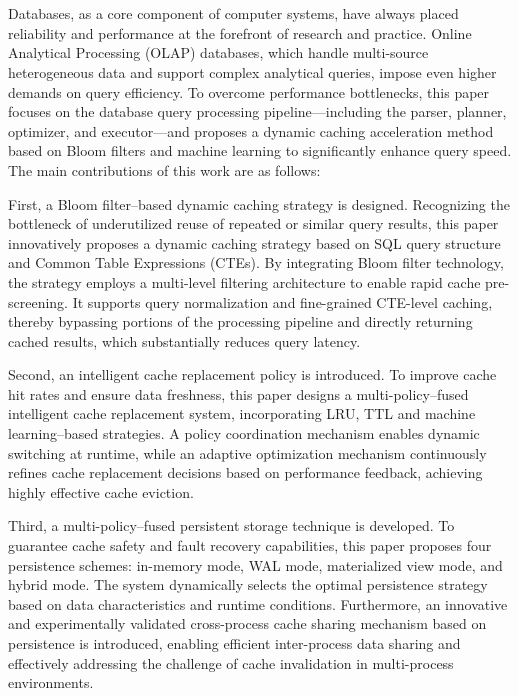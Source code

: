 \newpage
\vspace{-1cm}
\chapter*{}
\vspace{-0.5cm}

Databases, as a core component of computer systems, have always placed reliability and performance at the forefront of research and practice. Online Analytical Processing (OLAP) databases, which handle multi-source heterogeneous data and support complex analytical queries, impose even higher demands on query efficiency. To overcome performance bottlenecks, this paper focuses on the database query processing pipeline—including the parser, planner, optimizer, and executor—and proposes a dynamic caching acceleration method based on Bloom filters and machine learning to significantly enhance query speed. The main contributions of this work are as follows:

First, a Bloom filter–based dynamic caching strategy is designed. Recognizing the bottleneck of underutilized reuse of repeated or similar query results, this paper innovatively proposes a dynamic caching strategy based on SQL query structure and Common Table Expressions (CTEs). By integrating Bloom filter technology, the strategy employs a multi-level filtering architecture to enable rapid cache pre-screening. It supports query normalization and fine-grained CTE-level caching, thereby bypassing portions of the processing pipeline and directly returning cached results, which substantially reduces query latency.

Second, an intelligent cache replacement policy is introduced. To improve cache hit rates and ensure data freshness, this paper designs a multi-policy–fused intelligent cache replacement system, incorporating LRU, TTL and machine learning–based strategies. A policy coordination mechanism enables dynamic switching at runtime, while an adaptive optimization mechanism continuously refines cache replacement decisions based on performance feedback, achieving highly effective cache eviction.

Third, a multi-policy–fused persistent storage technique is developed. To guarantee cache safety and fault recovery capabilities, this paper proposes four persistence schemes: in-memory mode, WAL mode, materialized view mode, and hybrid mode. The system dynamically selects the optimal persistence strategy based on data characteristics and runtime conditions. Furthermore, an innovative and experimentally validated cross-process cache sharing mechanism based on persistence is introduced, enabling efficient inter-process data sharing and effectively addressing the challenge of cache invalidation in multi-process environments.

